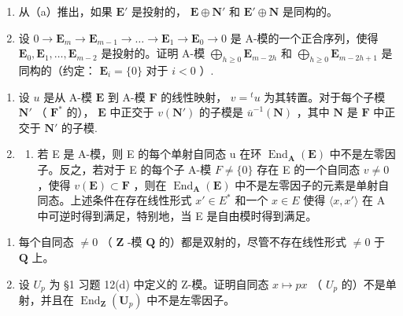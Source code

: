 \begin{enumerate}
\def\labelenumi{(\alph{enumi})}
\setcounter{enumi}{1}
\item
  从（a）推出，如果 \(\mathbf{E}'\) 是投射的， \(\mathbf{E} \oplus \mathbf{N}'\) 和 \(\mathbf{E}' \oplus \mathbf{N}\) 是同构的。
\item
  设 \(0 \to \mathbf{E}_m \to \mathbf{E}_{m-1} \to \ldots \to \mathbf{E}_1 \to \mathbf{E}_0 \to 0\) 是 A-模的一个正合序列，使得 \(\mathbf{E}_0, \mathbf{E}_1, \ldots, \mathbf{E}_{m-2}\) 是投射的。证明 A-模 \(\bigoplus_{h \geqslant 0} \mathbf{E}_{m-2h}\) 和 \(\bigoplus_{h \geqslant 0} \mathbf{E}_{m-2h+1}\) 是同构的（约定： \(\mathbf{E}_i = \{0\}\) 对于 \(i < 0\) ）.
\end{enumerate}

\begin{enumerate}
\def\labelenumi{\arabic{enumi}.}
\setcounter{enumi}{4}
\item
  设 \(u\) 是从 A-模 \(\mathbf{E}\) 到 A-模 \(\mathbf{F}\) 的线性映射， \(v = {}^t u\) 为其转置。对于每个子模 \(\mathbf{N}'\) （ \(\mathbf{F}^*\) 的）， \(\mathbf{E}\) 中正交于 \(v(\mathbf{N}')\) 的子模是 \(\overline{u}^{-1}(\mathbf{N})\) ，其中 \(\mathbf{N}\) 是 \(\mathbf{F}\) 中正交于 \(\mathbf{N}'\) 的子模.
\item
  \begin{enumerate}
  \def\labelenumii{(\alph{enumii})}
  \tightlist
  \item
    若 E 是 A-模，则 E 的每个单射自同态 u 在环 \(\operatorname{End}_{\mathbf{A}}(\mathbf{E})\) 中不是左零因子。反之，若对于 E 的每个子 A-模 \(F \neq \{0\}\) 存在 E 的一个自同态 \(v \neq 0\) ，使得 \(v(\mathbf{E}) \subset \mathbf{F}\) ，则在 \(\operatorname{End}_{\mathbf{A}}(\mathbf{E})\) 中不是左零因子的元素是单射自同态。上述条件在存在线性形式 \(x' \in E^*\) 和一个 \(x \in E\) 使得 \(\langle x, x' \rangle\) 在 A 中可逆时得到满足，特别地，当 E 是自由模时得到满足。
  \end{enumerate}
\end{enumerate}

\begin{enumerate}
\def\labelenumi{(\alph{enumi})}
\setcounter{enumi}{1}
\item
  每个自同态 \(\neq 0\) （ \(\mathbf{Z}\) -模 \(\mathbf{Q}\) 的）都是双射的，尽管不存在线性形式 \(\neq 0\) 于 \(\mathbf{Q}\) 上。
\item
  设 \(U_{p}\) 为 §1 习题 12(d) 中定义的 Z-模。证明自同态 \(x \mapsto px\) （ \(U_{p}\) 的）不是单射，并且在 \(\operatorname{End}_{\mathbf{Z}}(\mathbf{U}_{p})\) 中不是左零因子。
\end{enumerate}


